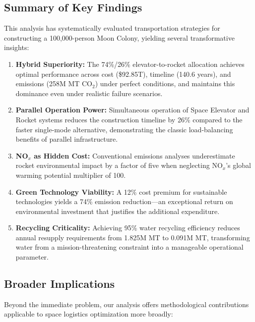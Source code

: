 \documentclass[12pt]{article}
\begin{document}
\subsection{Summary of Key Findings}

This analysis has systematically evaluated transportation strategies for constructing a 100,000-person Moon Colony, yielding several transformative insights:

\begin{enumerate}[leftmargin=2em]
	\item \textbf{Hybrid Superiority:} The 74\%/26\% elevator-to-rocket allocation achieves optimal performance across cost (\$92.85T), timeline (140.6 years), and emissions (258M MT CO$_2$) under perfect conditions, and maintains this dominance even under realistic failure scenarios.
	
	\item \textbf{Parallel Operation Power:} Simultaneous operation of Space Elevator and Rocket systems reduces the construction timeline by 26\% compared to the faster single-mode alternative, demonstrating the classic load-balancing benefits of parallel infrastructure.
	
	\item \textbf{NO$_x$ as Hidden Cost:} Conventional emissions analyses underestimate rocket environmental impact by a factor of five when neglecting NO$_x$'s global warming potential multiplier of 100.
	
	\item \textbf{Green Technology Viability:} A 12\% cost premium for sustainable technologies yields a 74\% emission reduction---an exceptional return on environmental investment that justifies the additional expenditure.
	
	\item \textbf{Recycling Criticality:} Achieving 95\% water recycling efficiency reduces annual resupply requirements from 1.825M MT to 0.091M MT, transforming water from a mission-threatening constraint into a manageable operational parameter.
\end{enumerate}

\subsection{Broader Implications}

Beyond the immediate problem, our analysis offers methodological contributions applicable to space logistics optimization more broadly:
\end{document}
